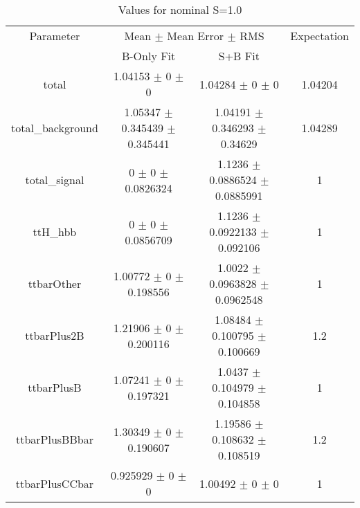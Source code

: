 \begin{table}
\centering
\caption{Values for nominal S=1.0}
\begin{tabular}{cccc}
\toprule
Parameter & \multicolumn{2}{c}{Mean $\pm$ Mean Error $\pm$ RMS} & Expectation\\
 & B-Only Fit & S+B Fit & \\
\midrule
total & \num{1.04153} $\pm$ \num{0} $\pm$ \num{0} & \num{1.04284} $\pm$ \num{0} $\pm$ \num{0} & \num{1.04204}\\
total\_background & \num{1.05347} $\pm$ \num{0.345439} $\pm$ \num{0.345441} & \num{1.04191} $\pm$ \num{0.346293} $\pm$ \num{0.34629} & \num{1.04289}\\
total\_signal & \num{0} $\pm$ \num{0} $\pm$ \num{0.0826324} & \num{1.1236} $\pm$ \num{0.0886524} $\pm$ \num{0.0885991} & \num{1}\\
ttH\_hbb & \num{0} $\pm$ \num{0} $\pm$ \num{0.0856709} & \num{1.1236} $\pm$ \num{0.0922133} $\pm$ \num{0.092106} & \num{1}\\
ttbarOther & \num{1.00772} $\pm$ \num{0} $\pm$ \num{0.198556} & \num{1.0022} $\pm$ \num{0.0963828} $\pm$ \num{0.0962548} & \num{1}\\
ttbarPlus2B & \num{1.21906} $\pm$ \num{0} $\pm$ \num{0.200116} & \num{1.08484} $\pm$ \num{0.100795} $\pm$ \num{0.100669} & \num{1.2}\\
ttbarPlusB & \num{1.07241} $\pm$ \num{0} $\pm$ \num{0.197321} & \num{1.0437} $\pm$ \num{0.104979} $\pm$ \num{0.104858} & \num{1}\\
ttbarPlusBBbar & \num{1.30349} $\pm$ \num{0} $\pm$ \num{0.190607} & \num{1.19586} $\pm$ \num{0.108632} $\pm$ \num{0.108519} & \num{1.2}\\
ttbarPlusCCbar & \num{0.925929} $\pm$ \num{0} $\pm$ \num{0} & \num{1.00492} $\pm$ \num{0} $\pm$ \num{0} & \num{1}\\
\bottomrule
\end{tabular}
\end{table}